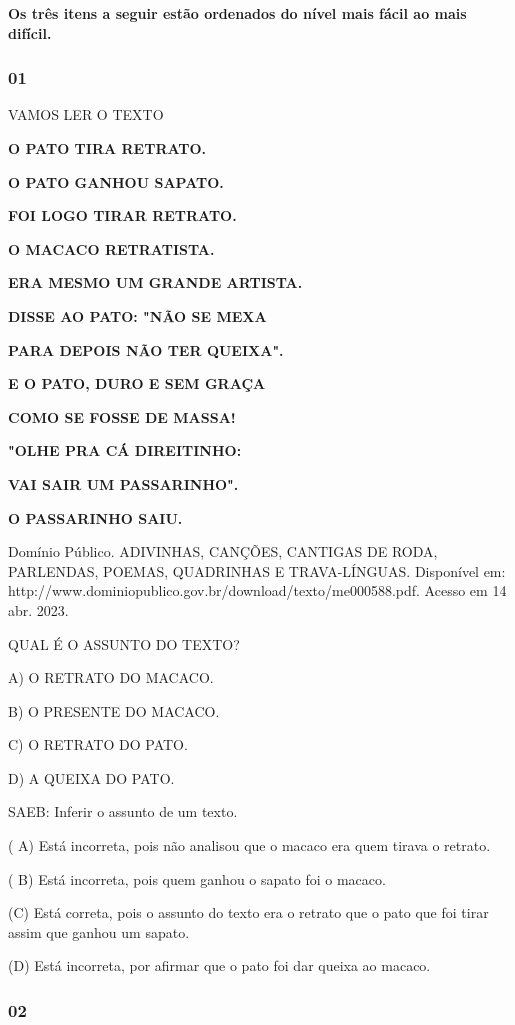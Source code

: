 \textbf{Os três itens a seguir estão ordenados do nível mais fácil ao mais
difícil.}

\subsubsection{01 }\label{section-16}

VAMOS LER O TEXTO

\textbf{O PATO TIRA RETRATO.}

\textbf{O PATO GANHOU SAPATO.}

\textbf{FOI LOGO TIRAR RETRATO.}

\textbf{O MACACO RETRATISTA.}

\textbf{ERA MESMO UM GRANDE ARTISTA.}

\textbf{DISSE AO PATO: "NÃO SE MEXA}

\textbf{PARA DEPOIS NÃO TER QUEIXA".}

\textbf{E O PATO, DURO E SEM GRAÇA}

\textbf{COMO SE FOSSE DE MASSA!}

\textbf{"OLHE PRA CÁ DIREITINHO:}

\textbf{VAI SAIR UM PASSARINHO".}

\textbf{O PASSARINHO SAIU.}

Domínio Público. ADIVINHAS, CANÇÕES, CANTIGAS DE RODA, PARLENDAS, POEMAS, QUADRINHAS E TRAVA-LÍNGUAS. Disponível em: http://www.dominiopublico.gov.br/download/texto/me000588.pdf. Acesso em 14 abr. 2023.

QUAL É O ASSUNTO DO TEXTO?

A) O RETRATO DO MACACO.

B) O PRESENTE DO MACACO.

C) O RETRATO DO PATO.

D) A QUEIXA DO PATO.

SAEB: Inferir o assunto de um texto.

( A) Está incorreta, pois não analisou que o macaco era quem tirava o
retrato.

( B) Está incorreta, pois quem ganhou o sapato foi o
macaco.

(C) Está correta, pois o assunto do texto era o retrato
que o pato que foi tirar assim que ganhou um sapato.

(D) Está incorreta, por afirmar que o pato foi dar queixa ao macaco.

\subsubsection{02 }\label{section-17}

